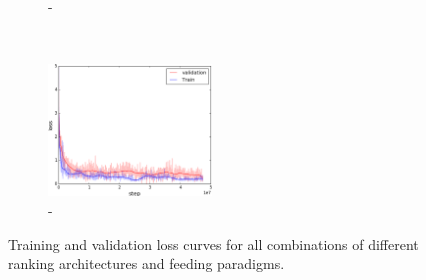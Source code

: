 \begin{figure}[t]
\begin{subfigure}[t]{0.3\textwidth}
        \caption{\label{fig:m3f2}\mthree-\ftwo}
    \end{subfigure}%
    ~
    \begin{subfigure}[t]{0.3\textwidth}
        \centering
        \includegraphics[height=3.5cm]{Images/step_m3f3.png}
        \caption{\label{fig:m3f3}\mthree-\fthree}
    \end{subfigure}%
    \vspace{-5pt}
    \caption{Training and validation loss curves for all combinations of different ranking architectures and feeding paradigms.}
    \label{fig:step-loss}
    \vspace{-5pt}
\end{figure}
